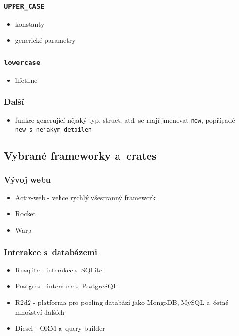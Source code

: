 \documentclass[a4paper, 12pt]{article} %
\newcommand{\rust}[1]{\texttt{#1}}
\begin{document}
		\subsubsection*{\texttt{UPPER\_CASE}}
			\begin{itemize}
				\item konstanty
				\item generické parametry
			\end{itemize}


		\subsubsection*{\texttt{lowercase}}
			\begin{itemize}
				\item lifetime
			\end{itemize}


		\subsubsection*{Další}
			\begin{itemize}
				\item funkce generující nějaký typ, struct, atd. se mají jmenovat \rust{new}, popřípadě \rust{new_s_nejakym_detailem}
				
				\hypertarget{_}{}
			\end{itemize}\cite{convention}


	\subsection{Vybrané frameworky a~crates}
		\subsubsection*{Vývoj webu}
			\begin{itemize} 
				\item Actix-web - velice rychlý všestranný framework
				\item Rocket
				\item Warp
			\end{itemize}


		\subsubsection*{Interakce s~databázemi}
			\begin{itemize} 
				\item Rusqlite - interakce s~SQLite
				\item Postgres - interakce s~PostgreSQL
				\item R2d2 - platforma pro pooling databází jako MongoDB, MySQL a~četné množství dalších
				\item Diesel - ORM a~query builder
			\end{itemize}
\end{document}
